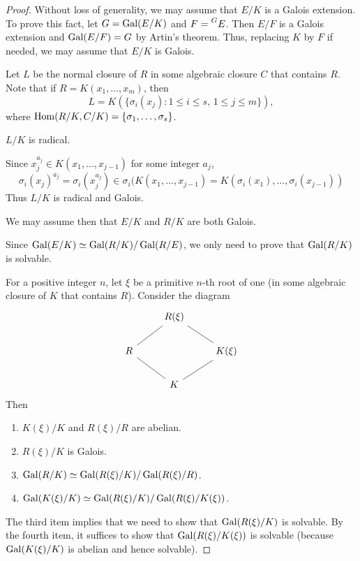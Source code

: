 \begin{proof}
    Without loss of generality, 
    we may assume that $E/K$ is a Galois extension. To prove this fact, 
    let $G=\operatorname{Gal}(E/K)$ and $F=\prescript{G}{}{E}$. Then
    $E/F$ is a Galois extension and $\operatorname{Gal}(E/F)=G$ by Artin's theorem. 
    Thus, replacing $K$ by $F$ if needed, we may assume that
    $E/K$ is Galois. 
    
    Let $L$ be the normal closure of $R$ in some
    algebraic closure $C$ that contains $R$. Note that 
    if $R=K(x_1,\dots,x_m)$, then 
    \[
    L=K(\{\sigma_i(x_j):1\leq i\leq s,\,1\leq j\leq m\}),
    \]
    where $\operatorname{Hom}(R/K,C/K)=\{\sigma_1,\dots,\sigma_s\}$. 
    
    \begin{claim}
        $L/K$ is radical. 
    \end{claim}
    
    Since $x_j^{a_j}\in K(x_1,\dots,x_{j-1})$ for some integer $a_j$, 
    \[
    \sigma_i(x_j)^{a_j}=\sigma_i\left(x_j^{a_j}\right)\in\sigma_i(K(x_1,\dots,x_{j-1})=K(\sigma_i(x_1),\dots,\sigma_i(x_{j-1}))
    \]
    Thus $L/K$ is radical and Galois. 
    
    We may assume then that $E/K$ and $R/K$ are both Galois. 
    
    Since $\operatorname{Gal}(E/K)\simeq\operatorname{Gal}(R/K)/\operatorname{Gal}(R/E)$, we only need
    to prove that $\operatorname{Gal}(R/K)$ is solvable. 
    
    For a positive integer $n$, 
    let $\xi$ be a primitive $n$-th root of one (in some algebraic closure
    of $K$ that contains $R$). Consider the diagram
    \[
    \begin{tikzcd}
	& {R(\xi)} \\
	R && {K(\xi)} \\
	& K
	\arrow[no head, from=1-2, to=2-3]
	\arrow[no head, from=1-2, to=2-1]
	\arrow[no head, from=2-1, to=3-2]
	\arrow[no head, from=3-2, to=2-3]
    \end{tikzcd}
    \]
    Then
    \begin{enumerate}
        \item $K(\xi)/K$ and $R(\xi)/R$ are abelian.
        \item $R(\xi)/K$ is Galois.
        \item $\operatorname{Gal}(R/K)\simeq\operatorname{Gal}(R(\xi)/K)/\operatorname{Gal}(R(\xi)/R)$. 
        \item $\operatorname{Gal}(K(\xi)/K)\simeq\operatorname{Gal}(R(\xi)/K)/\operatorname{Gal}(R(\xi)/K(\xi))$. 
    \end{enumerate}
    The third item implies that we need to 
    show that $\operatorname{Gal}(R(\xi)/K)$ is solvable. By the fourth item,
    it suffices to show that $\operatorname{Gal}(R(\xi)/K(\xi))$ is solvable (because $\operatorname{Gal}(K(\xi)/K)$ is abelian and hence solvable). 
    

\end{proof}
